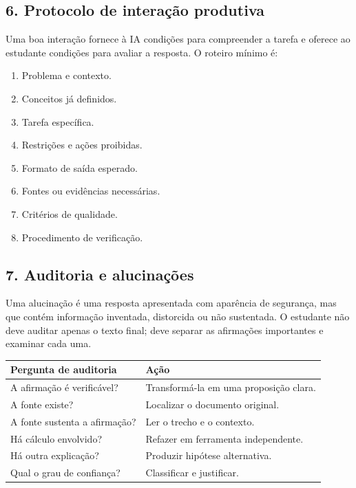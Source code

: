 \documentclass[11pt,a4paper]{article}
\begin{document}
\subsection*{6. Protocolo de interação produtiva}

Uma boa interação fornece à IA condições para compreender a tarefa e oferece ao estudante
condições para avaliar a resposta. O roteiro mínimo é:

\begin{enumerate}
\item Problema e contexto.
\item Conceitos já definidos.
\item Tarefa específica.
\item Restrições e ações proibidas.
\item Formato de saída esperado.
\item Fontes ou evidências necessárias.
\item Critérios de qualidade.
\item Procedimento de verificação.
\end{enumerate}

\subsection*{7. Auditoria e alucinações}

Uma alucinação é uma resposta apresentada com aparência de segurança, mas que contém
informação inventada, distorcida ou não sustentada. O estudante não deve auditar apenas o
texto final; deve separar as afirmações importantes e examinar cada uma.

{\small
\begin{tabular}{|p{}|p{}|}
\hline
\textbf{Pergunta de auditoria} & \textbf{Ação} \\
\hline
A afirmação é verificável? & Transformá-la em uma proposição clara. \\
\hline
A fonte existe? & Localizar o documento original. \\
\hline
A fonte sustenta a afirmação? & Ler o trecho e o contexto. \\
\hline
Há cálculo envolvido? & Refazer em ferramenta independente. \\
\hline
Há outra explicação? & Produzir hipótese alternativa. \\
\hline
Qual o grau de confiança? & Classificar e justificar. \\
\hline
\end{tabular}
}
\end{document}
